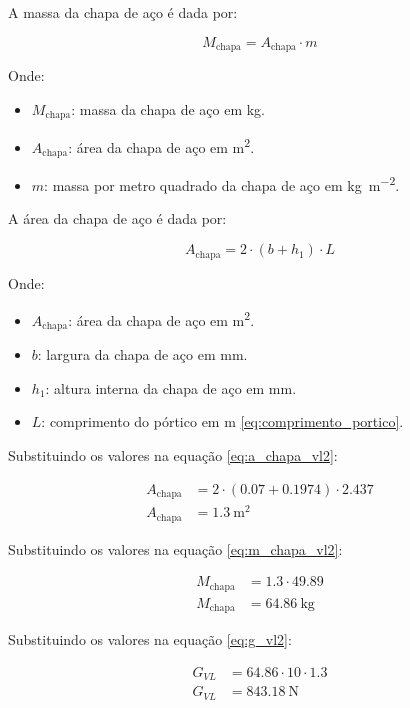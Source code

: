 \vspace{1em}

A massa da chapa de aço é dada por:

\begin{equation}
  M_{\text{chapa}} = A_{\text{chapa}} \cdot m
  \label{eq:m_chapa_vl2}
\end{equation}

Onde:

\begin{itemize}
  \item $M_{\text{chapa}}$: massa da chapa de aço em \si{\kilo\gram}.
  \item $A_{\text{chapa}}$: área da chapa de aço em \si{\meter^2}.
  \item $m$: massa por metro quadrado da chapa de aço em \si{\kilo\gram\per\meter^2}.
\end{itemize}

\vspace{1em}

A área da chapa de aço é dada por:

\begin{equation}
  A_{\text{chapa}} = 2 \cdot \left( b + h_1 \right) \cdot L
  \label{eq:a_chapa_vl2}
\end{equation}

Onde:

\begin{itemize}
  \item $A_{\text{chapa}}$: área da chapa de aço em \si{\meter^2}.
  \item $b$: largura da chapa de aço em \si{\milli\meter}.
  \item $h_1$: altura interna da chapa de aço em \si{\milli\meter}.
  \item $L$: comprimento do pórtico em \si{\meter} \eqref{eq:comprimento_portico}.
\end{itemize}

\vspace{1em}

Substituindo os valores na equação \eqref{eq:a_chapa_vl2}:

\begin{align*}
  A_{\text{chapa}} & = 2 \cdot \left( \num{0.07} + \num{0.1974} \right) \cdot \num{2.437} \\
  A_{\text{chapa}} & = \boxed{\SI{1.3}{\meter^2}}
\end{align*}

Substituindo os valores na equação \eqref{eq:m_chapa_vl2}:

\begin{align*}
  M_{\text{chapa}} & = \num{1.3} \cdot \num{49.89}    \\
  M_{\text{chapa}} & = \boxed{\SI{64.86}{\kilo\gram}}
\end{align*}

Substituindo os valores na equação \eqref{eq:g_vl2}:

\begin{align*}
  G_{VL} & = \num{64.86} \cdot \num{10} \cdot \num{1.3} \\
  G_{VL} & = \boxed{\SI{843.18}{\newton}}
\end{align*}
